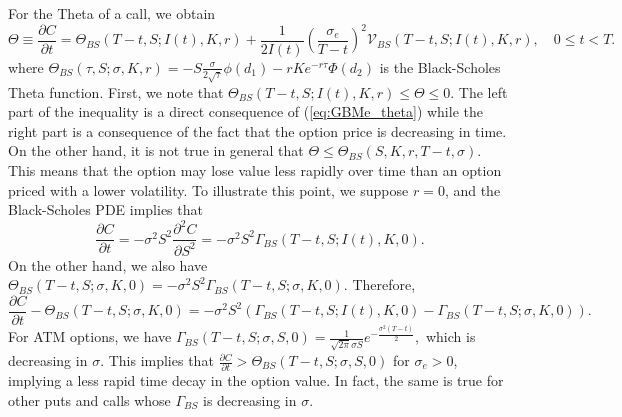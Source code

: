 \documentclass[11pt]{article}
\numberwithin{equation}{section}
\numberwithin{theorem}{section}
\begin{document}
For the  Theta of a call, we obtain
\begin{equation}
\Theta\equiv\frac{\partial C}{\partial t}=\Theta_{BS}\left(T-t,S;I\left(t\right),K,r\right)+\frac{1}{2I(
t)}\left(\frac{\sigma_{e}}{T-t}\right)^{2}\mathcal{V}_{BS}\left(T-t,S;I(t),K,r\right),\quad0\leq t<T.\label{eq:GBMe_theta}
\end{equation}
where $\Theta_{BS}\left(\tau ,S;\sigma,K,r\right)=-S\frac{\sigma}{2\sqrt{\tau}}\phi\left(d_{1}\right)-rKe^{-r\tau}\Phi\left(d_{2}\right)$
is  the Black-Scholes Theta function. First, we note that  $\Theta_{BS}\left(T-t,S;I(t),K,r\right)\leq\Theta\leq0.$
The left part of the inequality is a direct consequence of (\ref{eq:GBMe_theta})
while the right part is a consequence of the fact that the option
price is decreasing in time. On the other hand,  it is not true in general that $\Theta\leq\Theta_{BS}\left(S,K,r,T-t,\sigma\right).$
This means that the option may   lose   value less rapidly  over time 
than an option priced with a lower volatility.  To  illustrate this point, we suppose  $r=0$, and    the Black-Scholes PDE implies that 
\[
\frac{\partial C}{\partial t}=-\sigma^{2}S^{2}\frac{\partial^{2}C}{\partial S^{2}}=-\sigma^{2}S^{2}\Gamma_{BS}\left(T-t,S;I(t),K,0\right).
\]
On the other hand, we also have $\Theta_{BS}\left(T-t,S;\sigma,K,0\right)=-\sigma^{2}S^{2}\Gamma_{BS}\left(T-t,S;\sigma,K,0\right).$
Therefore,
\[
\frac{\partial C}{\partial t}-\Theta_{BS}\left(T-t,S;\sigma,K,0\right)=-\sigma^{2}S^{2}\left(\Gamma_{BS}\left(T-t,S;I(t),K,0\right)-\Gamma_{BS}\left(T-t,S;\sigma,K,0\right)\right).
\]
For ATM options, we have $\Gamma_{BS}\left(T-t,S;\sigma,S,0\right)=\frac{1}{\sqrt{2\pi}\sigma S}e^{-\frac{\sigma{}^{2}(T-t)}{2}},$
which is decreasing in $\sigma$.  This implies that $\frac{\partial C}{\partial t}>\Theta_{BS}\left(T-t,S;\sigma,S,0\right)$ for 
 $\sigma_{e}>0$, implying   a less rapid time decay in the option value. In fact, the same is true for  other puts and calls whose $\Gamma_{BS}$ is  decreasing in $\sigma$. 
\end{document}
